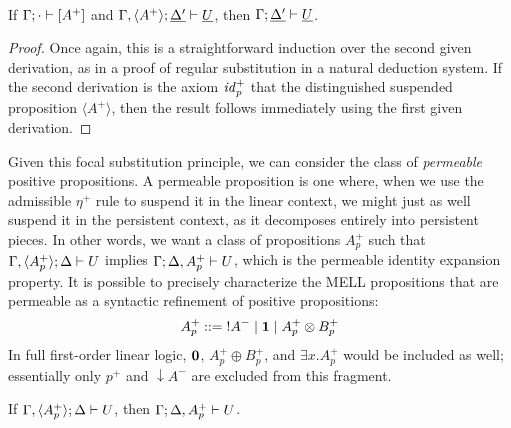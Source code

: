 \bigskip
\begin{theorem}
\label{thm:fsubst-posper}~\\
If ${\Gamma};{\cdot} \vdash {[A^+]} \mathstrut$ 
and ${\Gamma, \langle A^+ \rangle};{\underline{\Delta'}} \vdash {\underline{U}} \mathstrut$, 
then ${\Gamma};{\underline{\Delta'}} \vdash {\underline{U}} \mathstrut$.
\end{theorem}

\begin{proof}
  Once again, this is a straightforward induction over the second
  given derivation, as in a proof of regular substitution in a natural
  deduction system. If the second derivation is the axiom ${\it
    id}_p^+$ that the distinguished suspended proposition $\langle A^+
  \rangle$, then the result follows immediately using the first given
  derivation.
\end{proof}

Given this focal substitution principle, we can consider the class of
{\it permeable} positive  propositions. A permeable 
proposition is one where, when we use the admissible $\eta^+$ rule to
suspend it in the linear context, we might just as well suspend it in
the persistent context, as it decomposes entirely into persistent
pieces. In other words, we want a class of propositions $A^+_p$ such
that ${\Gamma, \langle A^+_p \rangle};{\Delta} \vdash {U} \mathstrut$ implies
${\Gamma};{\Delta, A^+_p} \vdash {U} \mathstrut$, which is the permeable identity
expansion property. It is possible to precisely characterize the MELL
propositions that are permeable as a syntactic refinement of positive
propositions:
\[
A^+_p ::= {!}A^- \mid \mathbf{1} \mid A^+_p \otimes B^+_p
\]
In full first-order linear logic, $\mathbf{0}$, $A^+_p \oplus B^+_p$, and
$\exists x. A^+_p$ would be included as well; essentially only $p^+$
and ${\downarrow}A^-$ are excluded from this fragment. 
%

\bigskip
\begin{theorem}\label{thm:permident}
If ${\Gamma, \langle A^+_p \rangle};{\Delta} \vdash {U} \mathstrut$, 
then ${\Gamma};{\Delta, A^+_p} \vdash {U} \mathstrut$.
\end{theorem}

